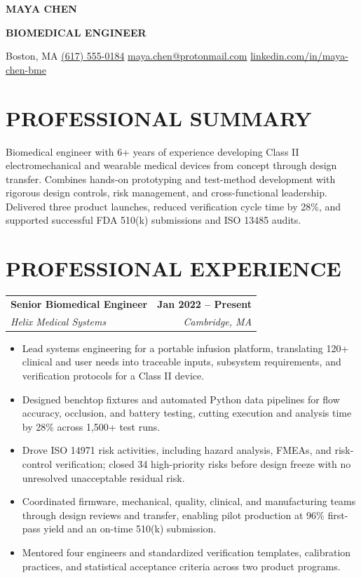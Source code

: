 \documentclass[10pt,letterpaper]{article}
\makeatletter
\newcommand{\contactsep}{\hspace{0.55em}\textcolor{blue}{\textbar}\hspace{0.55em}}
\newcommand{\role}[4]{%
  \begin{tabularx}{\textwidth}{@{}Xr@{}}
    \textbf{\color{charcoal}#1} & \textbf{\color{charcoal}#2} \\
    \textit{\color{muted}#3} & \textit{\color{muted}#4}
  \end{tabularx}\vspace{-0.25em}
}
\makeatother
\begin{document}
\fontsize{9.35}{10.7}\selectfont

\begin{center}
  {\fontsize{23}{25}\selectfont\bfseries\color{navy} MAYA CHEN}\par
  \vspace{1pt}
  {\fontsize{11.5}{12.5}\selectfont\bfseries\color{blue} BIOMEDICAL ENGINEER}\par
  \vspace{4pt}
  \small
  Boston, MA
  \contactsep
  \href{tel:+16175550184}{(617) 555-0184}
  \contactsep
  \href{mailto:maya.chen@protonmail.com}{maya.chen@protonmail.com}
  \contactsep
  \href{https://www.linkedin.com/in/maya-chen-bme}{linkedin.com/in/maya-chen-bme}
\end{center}

\vspace{-2pt}

\section*{PROFESSIONAL SUMMARY}
Biomedical engineer with 6+ years of experience developing Class II electromechanical and wearable medical devices from concept through design transfer. Combines hands-on prototyping and test-method development with rigorous design controls, risk management, and cross-functional leadership. Delivered three product launches, reduced verification cycle time by 28\%, and supported successful FDA 510(k) submissions and ISO 13485 audits.

\section*{PROFESSIONAL EXPERIENCE}

\role{Senior Biomedical Engineer}{Jan 2022 -- Present}{Helix Medical Systems}{Cambridge, MA}
\begin{itemize}
  \item Lead systems engineering for a portable infusion platform, translating 120+ clinical and user needs into traceable inputs, subsystem requirements, and verification protocols for a Class II device.
  \item Designed benchtop fixtures and automated Python data pipelines for flow accuracy, occlusion, and battery testing, cutting execution and analysis time by 28\% across 1,500+ test runs.
  \item Drove ISO 14971 risk activities, including hazard analysis, FMEAs, and risk-control verification; closed 34 high-priority risks before design freeze with no unresolved unacceptable residual risk.
  \item Coordinated firmware, mechanical, quality, clinical, and manufacturing teams through design reviews and transfer, enabling pilot production at 96\% first-pass yield and an on-time 510(k) submission.
  \item Mentored four engineers and standardized verification templates, calibration practices, and statistical acceptance criteria across two product programs.
\end{itemize}
\end{document}
